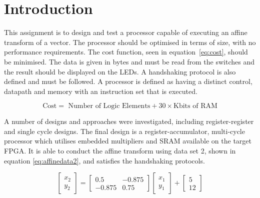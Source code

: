 
\section{Introduction}\label{sect:intro}

This assignment is to design and test a processor capable of executing an affine transform of a vector. 
The processor should be optimised in terms of size, with no performance requirements. 
The cost function, seen in equation~\eqref{eq:cost}, should be minimised. 
The data is given in bytes and must be read from the switches and the result should be displayed on the LEDs. 
A handshaking protocol is also defined and must be followed. 
A processor is defined as having a distinct control, datapath and memory with an instruction set that is executed. 

\begin{equation}\label{eq:cost}
\mbox{Cost} = \mbox{ Number of Logic Elements} + 30 \times \mbox{Kbits of RAM}
\end{equation}

A number of designs and approaches were investigated, including register-register and single cycle designs.
The final design is a register-accumulator, multi-cycle processor which utilises embedded multipliers and SRAM available on the target FPGA. 
It is able to conduct the affine transform using data set 2, shown in equation \eqref{eq:affinedata2}, and satisfies the handshaking protocols. 

\begin{equation}\label{eq:affinedata2}
\begin{bmatrix}
x_2 \\
y_2 
\end{bmatrix}
=
\begin{bmatrix}
0.5 & -0.875 \\
-0.875 & 0.75 
\end{bmatrix}
\begin{bmatrix}
x_1 \\
y_1
\end{bmatrix}
+
\begin{bmatrix}
5 \\
12
\end{bmatrix}
\end{equation}


